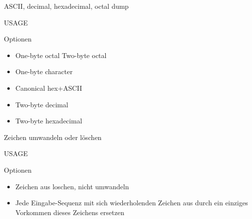 \documentclass[aspectratio=43]{beamer}
\begin{document}
\begin{frame} 
	\begin{block}{} 
        		ASCII, decimal, hexadecimal, octal dump
	\end{block}
	\begin{block}{USAGE} 
        		\\
        		\hspace{1.4cm}
	
	\end{block}

	\begin{exampleblock}{Optionen} 
	\begin{itemize}
	\item {} One-byte octal  Two-byte octal 
	\item {} One-byte character 
	\item {} Canonical hex+ASCII  
	\item {} Two-byte decimal 
	\item {} Two-byte hexadecimal 
	\end{itemize}
	
	\end{exampleblock}



\end{frame}

\begin{frame} 
	\begin{block}{} 
        Zeichen umwandeln oder löschen
	\end{block}
	\begin{block}{USAGE} 
	\end{block}
	\begin{exampleblock}{Optionen} 
	\begin{itemize}
	\item {} Zeichen aus  loschen, nicht umwandeln
	\item {} Jede Eingabe-Sequenz mit sich wiederholenden Zeichen aus  
              durch ein einziges Vorkommen dieses Zeichens ersetzen
	\end{itemize}
	
	\end{exampleblock}
\end{frame}
\end{document}

